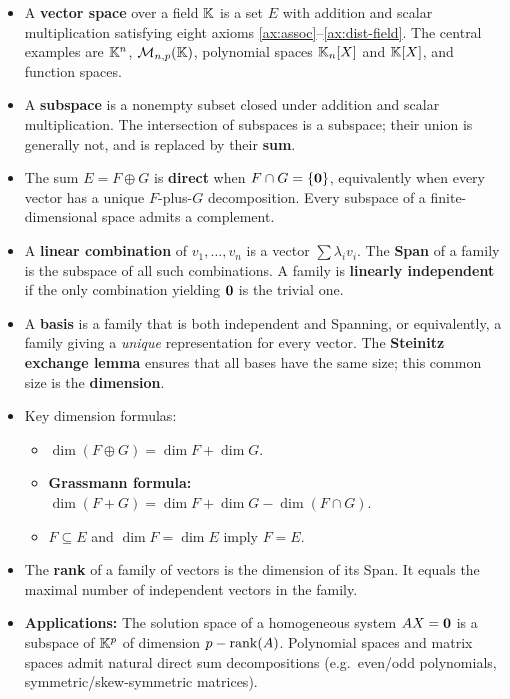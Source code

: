 \begin{itemize}
  \item A \textbf{vector space} over a field ${\mathbb{K}}$ is a set $E$ with
    addition and scalar multiplication satisfying eight axioms
    \ref{ax:assoc}--\ref{ax:dist-field}. The central examples are
    ${\mathbb{K}}^n$, $\mathcal{M}_{n,p}({\mathbb{K}})$, polynomial spaces ${\mathbb{K}}_n[X]$ and ${\mathbb{K}}[X]$,
    and function spaces.

  \item A \textbf{subspace} is a nonempty subset closed under addition
    and scalar multiplication. The intersection of subspaces is a
    subspace; their union is generally not, and is replaced by their
    \textbf{sum}.

  \item The sum $E = F\oplus G$ is \textbf{direct} when
    $F\cap G = \left\{\mathbf{0}\right\}$, equivalently when every vector has a
    unique $F$-plus-$G$ decomposition. Every subspace of a
    finite-dimensional space admits a complement.

  \item A \textbf{linear combination} of $v_1,\ldots,v_n$ is a vector
    $\sum\lambda_iv_i$. The \textbf{Span} of a family is the subspace of
    all such combinations. A family is \textbf{linearly independent} if
    the only combination yielding $\mathbf{0}$ is the trivial one.

  \item A \textbf{basis} is a family that is both independent and
    Spanning, or equivalently, a family giving a \emph{unique}
    representation for every vector. The \textbf{Steinitz exchange lemma}
    ensures that all bases have the same size; this common size is the
    \textbf{dimension}.

  \item Key dimension formulas:
    \begin{itemize}
      \item $\dim(F\oplus G) = \dim F + \dim G$.
      \item \textbf{Grassmann formula:}
        $\dim(F+G)=\dim F+\dim G-\dim(F\cap G)$.
      \item $F\subseteq E$ and $\dim F=\dim E$ imply $F = E$.
    \end{itemize}

  \item The \textbf{rank} of a family of vectors is the dimension of its
    Span. It equals the maximal number of independent vectors in the
    family.

  \item \textbf{Applications:} The solution space of a homogeneous system
    $AX=\mathbf{0}$ is a subspace of ${\mathbb{K}}^p$ of dimension $p-\operatorname{rank}(A)$.
    Polynomial spaces and matrix spaces admit natural direct sum
    decompositions (e.g.\ even/odd polynomials, symmetric/skew-symmetric
    matrices).
\end{itemize}
